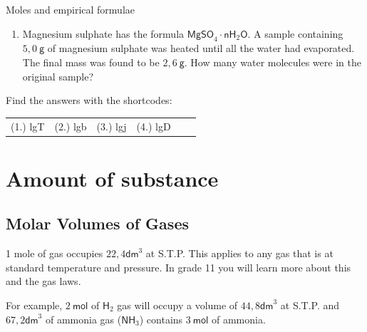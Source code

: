 \begin{exercises}{Moles and empirical formulae
      }
\begin{enumerate}[noitemsep, label=\textbf{\arabic*}. ]
\item Magnesium sulphate has the formula $\mathsf{MgSO}_{4} \cdot \mathsf{n H}_{2}\mathsf{O}$. A sample containing $5,0 ~\mathsf{g}$ of magnesium sulphate was heated until all the water had evaporated. The final mass was found to be $2,6~\mathsf{g}$. How many water molecules were in the original sample?
\end{enumerate}
    \label{m38712*cid7}
\par {} Find the answers with the shortcodes:
 \par \begin{tabular}[h]{cccccc}
 (1.) lgT  &  (2.) lgb  &  (3.) lgj  &  (4.) lgD  & \end{tabular}
\end{exercises}
\section{Amount of substance}
            \subsection*{Molar Volumes of Gases}
            \nopagebreak
            \par
            \label{m38712*eip-id1168064596799}
  { \label{m38712*eip-id1168053572222}1 mole of gas occupies $22,4{\mathsf{dm}}^{3}$ at S.T.P. } 
      \label{m38712*id282112}This applies to any gas that is at standard temperature and pressure. In grade 11 you will learn more about this and the gas laws.\par 
For example, $2~\mathsf{mol}$ of $\mathsf{H}_2$ gas will occupy a volume of $44,8{\mathsf{dm}}^{3}$ at S.T.P. and $67,2{\mathsf{dm}}^{3}$ of ammonia gas ($\mathsf{NH}_3$) contains $3~\mathsf{mol}$ of ammonia.
    \label{m38712*cid8}
